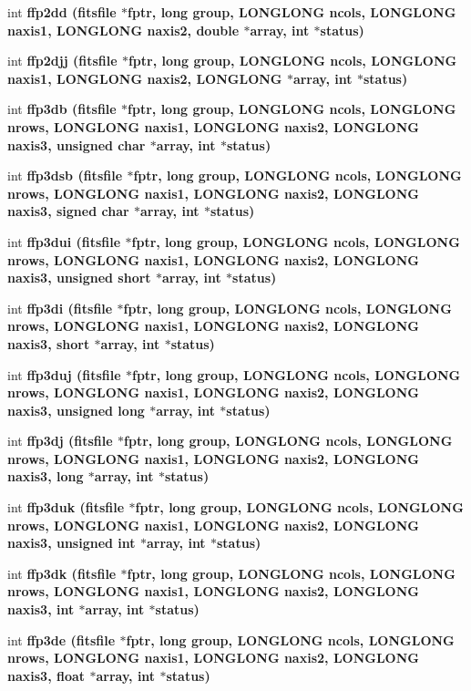 \begin{CompactItemize}
\item 
int \bf{ffp2dd} (\bf{fitsfile} $\ast$fptr, long group, \bf{LONGLONG} ncols, \bf{LONGLONG} naxis1, \bf{LONGLONG} naxis2, double $\ast$array, int $\ast$status)
\item 
int \bf{ffp2djj} (\bf{fitsfile} $\ast$fptr, long group, \bf{LONGLONG} ncols, \bf{LONGLONG} naxis1, \bf{LONGLONG} naxis2, \bf{LONGLONG} $\ast$array, int $\ast$status)
\item 
int \bf{ffp3db} (\bf{fitsfile} $\ast$fptr, long group, \bf{LONGLONG} ncols, \bf{LONGLONG} nrows, \bf{LONGLONG} naxis1, \bf{LONGLONG} naxis2, \bf{LONGLONG} naxis3, unsigned char $\ast$array, int $\ast$status)
\item 
int \bf{ffp3dsb} (\bf{fitsfile} $\ast$fptr, long group, \bf{LONGLONG} ncols, \bf{LONGLONG} nrows, \bf{LONGLONG} naxis1, \bf{LONGLONG} naxis2, \bf{LONGLONG} naxis3, signed char $\ast$array, int $\ast$status)
\item 
int \bf{ffp3dui} (\bf{fitsfile} $\ast$fptr, long group, \bf{LONGLONG} ncols, \bf{LONGLONG} nrows, \bf{LONGLONG} naxis1, \bf{LONGLONG} naxis2, \bf{LONGLONG} naxis3, unsigned short $\ast$array, int $\ast$status)
\item 
int \bf{ffp3di} (\bf{fitsfile} $\ast$fptr, long group, \bf{LONGLONG} ncols, \bf{LONGLONG} nrows, \bf{LONGLONG} naxis1, \bf{LONGLONG} naxis2, \bf{LONGLONG} naxis3, short $\ast$array, int $\ast$status)
\item 
int \bf{ffp3duj} (\bf{fitsfile} $\ast$fptr, long group, \bf{LONGLONG} ncols, \bf{LONGLONG} nrows, \bf{LONGLONG} naxis1, \bf{LONGLONG} naxis2, \bf{LONGLONG} naxis3, unsigned long $\ast$array, int $\ast$status)
\item 
int \bf{ffp3dj} (\bf{fitsfile} $\ast$fptr, long group, \bf{LONGLONG} ncols, \bf{LONGLONG} nrows, \bf{LONGLONG} naxis1, \bf{LONGLONG} naxis2, \bf{LONGLONG} naxis3, long $\ast$array, int $\ast$status)
\item 
int \bf{ffp3duk} (\bf{fitsfile} $\ast$fptr, long group, \bf{LONGLONG} ncols, \bf{LONGLONG} nrows, \bf{LONGLONG} naxis1, \bf{LONGLONG} naxis2, \bf{LONGLONG} naxis3, unsigned int $\ast$array, int $\ast$status)
\item 
int \bf{ffp3dk} (\bf{fitsfile} $\ast$fptr, long group, \bf{LONGLONG} ncols, \bf{LONGLONG} nrows, \bf{LONGLONG} naxis1, \bf{LONGLONG} naxis2, \bf{LONGLONG} naxis3, int $\ast$array, int $\ast$status)
\item 
int \bf{ffp3de} (\bf{fitsfile} $\ast$fptr, long group, \bf{LONGLONG} ncols, \bf{LONGLONG} nrows, \bf{LONGLONG} naxis1, \bf{LONGLONG} naxis2, \bf{LONGLONG} naxis3, float $\ast$array, int $\ast$status)

\end{CompactItemize}
